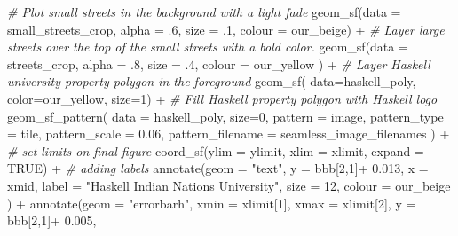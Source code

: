 \documentclass[
  paper=a4,
  ,captions=tableheading
]{scrartcl}
\newenvironment{Shaded}{\begin{snugshade}}{\end{snugshade}}
\newcommand{\AttributeTok}[1]{\textcolor[rgb]{0.77,0.63,0.00}{#1}}
\newcommand{\CommentTok}[1]{\textcolor[rgb]{0.56,0.35,0.01}{\textit{#1}}}
\newcommand{\ConstantTok}[1]{\textcolor[rgb]{0.00,0.00,0.00}{#1}}
\newcommand{\DecValTok}[1]{\textcolor[rgb]{0.00,0.00,0.81}{#1}}
\newcommand{\FloatTok}[1]{\textcolor[rgb]{0.00,0.00,0.81}{#1}}
\newcommand{\FunctionTok}[1]{\textcolor[rgb]{0.00,0.00,0.00}{#1}}
\newcommand{\NormalTok}[1]{#1}
\newcommand{\SpecialCharTok}[1]{\textcolor[rgb]{0.00,0.00,0.00}{#1}}
\newcommand{\StringTok}[1]{\textcolor[rgb]{0.31,0.60,0.02}{#1}}
\begin{document}
\begin{Shaded}
\begin{Highlighting}[]
  \CommentTok{\# Plot small streets in the background with a light fade}
  \FunctionTok{geom\_sf}\NormalTok{(}\AttributeTok{data =}\NormalTok{ small\_streets\_crop, }\AttributeTok{alpha =}\NormalTok{ .}\DecValTok{6}\NormalTok{, }
          \AttributeTok{size =}\NormalTok{ .}\DecValTok{1}\NormalTok{, }\AttributeTok{colour =}\NormalTok{ our\_beige) }\SpecialCharTok{+}
  \CommentTok{\# Layer large streets over the top of the small streets with a bold color.}
  \FunctionTok{geom\_sf}\NormalTok{(}\AttributeTok{data =}\NormalTok{ streets\_crop, }\AttributeTok{alpha =}\NormalTok{ .}\DecValTok{8}\NormalTok{, }
          \AttributeTok{size =}\NormalTok{ .}\DecValTok{4}\NormalTok{, }\AttributeTok{colour =}\NormalTok{ our\_yellow ) }\SpecialCharTok{+}
  \CommentTok{\# Layer Haskell university property polygon in the foreground}
  \FunctionTok{geom\_sf}\NormalTok{( }\AttributeTok{data=}\NormalTok{haskell\_poly, }\AttributeTok{color=}\NormalTok{our\_yellow, }\AttributeTok{size=}\DecValTok{1}\NormalTok{) }\SpecialCharTok{+}
  \CommentTok{\# Fill Haskell property polygon with Haskell logo}
   \FunctionTok{geom\_sf\_pattern}\NormalTok{( }
     \AttributeTok{data =}\NormalTok{ haskell\_poly,}
     \AttributeTok{size=}\DecValTok{0}\NormalTok{,}
    \AttributeTok{pattern       =} \StringTok{\textquotesingle{}image\textquotesingle{}}\NormalTok{,}
    \AttributeTok{pattern\_type  =} \StringTok{\textquotesingle{}tile\textquotesingle{}}\NormalTok{,}
    \AttributeTok{pattern\_scale =} \FloatTok{0.06}\NormalTok{,}
    \AttributeTok{pattern\_filename =}\NormalTok{ seamless\_image\_filenames}
\NormalTok{  ) }\SpecialCharTok{+}
  \CommentTok{\# set limits on final figure }
  \FunctionTok{coord\_sf}\NormalTok{(}\AttributeTok{ylim =}\NormalTok{ ylimit, }\AttributeTok{xlim =}\NormalTok{ xlimit, }\AttributeTok{expand =} \ConstantTok{TRUE}\NormalTok{) }\SpecialCharTok{+}
  \CommentTok{\# adding labels}
  \FunctionTok{annotate}\NormalTok{(}\AttributeTok{geom =} \StringTok{"text"}\NormalTok{, }\AttributeTok{y =}\NormalTok{ bbb[}\DecValTok{2}\NormalTok{,}\DecValTok{1}\NormalTok{]}\SpecialCharTok{+} \FloatTok{0.013}\NormalTok{, }\AttributeTok{x =}\NormalTok{ xmid, }
           \AttributeTok{label =} \StringTok{"Haskell Indian Nations University"}\NormalTok{, }\AttributeTok{size =} \DecValTok{12}\NormalTok{, }\AttributeTok{colour =}\NormalTok{ our\_beige}
\NormalTok{           ) }\SpecialCharTok{+}
  \FunctionTok{annotate}\NormalTok{(}\AttributeTok{geom =} \StringTok{"errorbarh"}\NormalTok{, }\AttributeTok{xmin =}\NormalTok{ xlimit[}\DecValTok{1}\NormalTok{], }\AttributeTok{xmax =}\NormalTok{ xlimit[}\DecValTok{2}\NormalTok{], }\AttributeTok{y =}\NormalTok{ bbb[}\DecValTok{2}\NormalTok{,}\DecValTok{1}\NormalTok{]}\SpecialCharTok{+} \FloatTok{0.005}\NormalTok{,   }

\end{Highlighting}
\end{Shaded}
\end{document}
